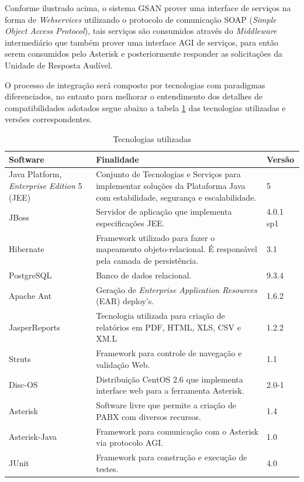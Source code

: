 Conforme ilustrado acima, o sistema GSAN prover uma interface de serviços na forma de \textit{Webservices} utilizando o protocolo de comunicação SOAP (\textit{Simple Object Access Protocol}), tais serviços são consumidos através do \textit{Middleware} intermediário que também prover uma interface AGI de serviços, para então serem consumidos pelo Asterisk e posteriormente responder as solicitações da Unidade de Resposta Audível.

O processo de integração será composto por tecnologias com paradigmas diferenciados, no entanto para melhorar o entendimento dos detalhes de compatibilidades adotados segue abaixo a tabela \ref{tabela:tecnologiasUtilizadas}
	 das tecnologias utilizadas e versões correspondentes.


\begin{table}[H]
	\center
	\footnotesize
	\caption{Tecnologias utilizadas}
	\label{tabela:tecnologiasUtilizadas}
	\begin{tabular}{|p{4cm}|p{7cm}|p{2cm}|}
		\hline
		\textbf{Software} & \textbf{Finalidade} & \textbf{Versão} \\
		\hline
		Java Platform, \textit{Enterprise Edition} 5 (JEE) & Conjunto de Tecnologias e Serviços para implementar soluções da Plataforma Java com estabilidade, segurança e escalabilidade. & 5 \\
		\hline
		JBoss 				& Servidor de aplicação que implementa especificações JEE. 								& 4.0.1 sp1 \\
		\hline
		Hibernate 			& Framework utilizado para fazer o mapeamento objeto-relacional. É responsável pela camada de persistência. & 3.1 \\
		\hline
		PostgreSQL 			& Banco de dados relacional. 															& 9.3.4 \\
		\hline
		Apache Ant 			& Geração de \textit{Enterprise Application Resources} (EAR) deploy’s. 					& 1.6.2 \\
		\hline
		JasperReports 		& Tecnologia utilizada para criação de relatórios em PDF, HTML, XLS, CSV e XM.L 		& 1.2.2 \\
		\hline
		Struts 				& Framework para controle de navegação e validação Web. 								& 1.1	 \\
		\hline
		Disc-OS 			& Distribuição CentOS 2.6 que implementa interface web para a ferramenta Asterisk. 		& 2.0-1 \\
		\hline
		Asterisk 			& Software livre que permite a criação de PABX com diversos recursos. 					& 1.4 \\		
		\hline
		Asterisk-Java 		& Framework para comunicação com o Asterisk via protocolo AGI. 							& 1.0 \\
		\hline
		JUnit		 		& Framework para construção e execução de testes. 										& 4.0 \\		
		\hline			
	\end{tabular}
\end{table}



